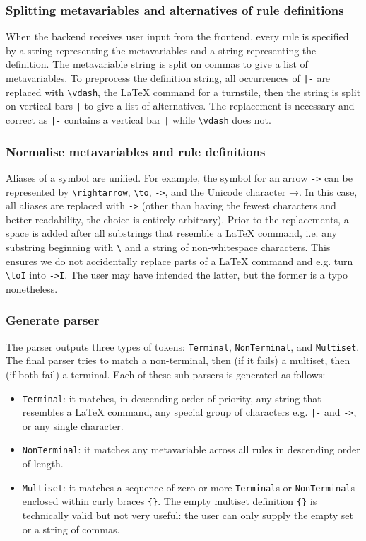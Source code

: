 \subsubsection{Splitting metavariables and alternatives of rule definitions}
When the backend receives user input from the frontend, every rule is specified by a string representing the metavariables and a string representing the definition. The metavariable string is split on commas to give a list of metavariables. To preprocess the definition string, all occurrences of \lstinline{|-} are replaced with \lstinline{\vdash}, the \LaTeX{} command for a turnstile, then the string is split on vertical bars \lstinline{|} to give a list of alternatives. The replacement is necessary and correct as \lstinline{|-} contains a vertical bar \lstinline{|} while \lstinline{\vdash} does not.

\subsubsection{Normalise metavariables and rule definitions}
\label{syntax:normalise}
Aliases of a symbol are unified. For example, the symbol for an arrow \lstinline{->} can be represented by \lstinline{\rightarrow}, \lstinline{\to}, \lstinline{->}, and the Unicode character →. In this case, all aliases are replaced with \lstinline{->} (other than having the fewest characters and better readability, the choice is entirely arbitrary). Prior to the replacements, a space is added after all substrings that resemble a \LaTeX{} command, i.e. any substring beginning with \lstinline{\} and a string of non-whitespace characters. This ensures we do not accidentally replace parts of a \LaTeX{} command and e.g. turn \lstinline{\toI} into \lstinline{->I}. The user may have intended the latter, but the former is a typo nonetheless.

\subsubsection{Generate parser}
The parser outputs three types of tokens: \lstinline{Terminal}, \lstinline{NonTerminal}, and \lstinline{Multiset}. The final parser tries to match a non-terminal, then (if it fails) a multiset, then (if both fail) a terminal. Each of these sub-parsers is generated as follows:
\begin{itemize}
    \item \lstinline{Terminal}: it matches, in descending order of priority, any string that resembles a \LaTeX{} command, any special group of characters e.g. \lstinline{|-} and \lstinline{->}, or any single character.
    \item \lstinline{NonTerminal}: it matches any metavariable across all rules in descending order of length.
    \item \lstinline{Multiset}: it matches a sequence of zero or more \lstinline{Terminal}s or \lstinline{NonTerminal}s enclosed within curly braces \lstinline|{}|. The empty multiset definition \lstinline|{}| is technically valid but not very useful: the user can only supply the empty set or a string of commas.
\end{itemize}

